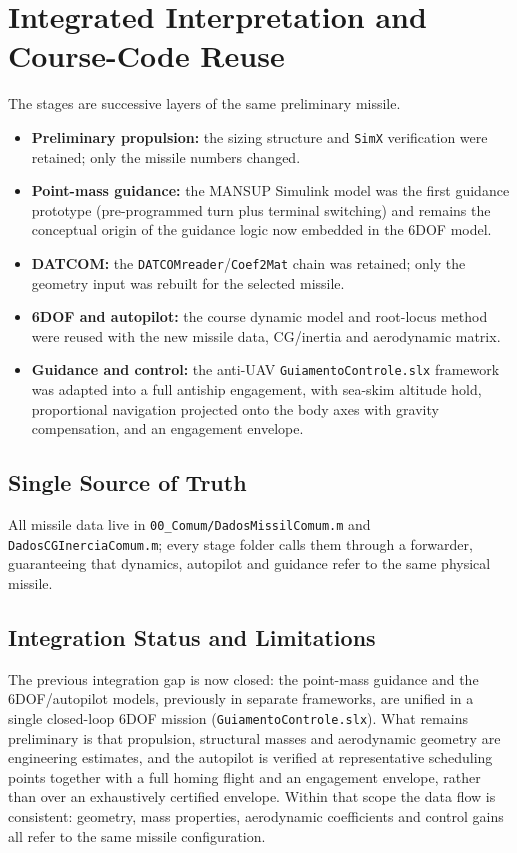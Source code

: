 \section{Integrated Interpretation and Course-Code Reuse}

The stages are successive layers of the same preliminary missile.

\begin{itemize}
    \item \textbf{Preliminary propulsion:} the sizing structure and \texttt{SimX} verification were retained; only the missile numbers changed.
    \item \textbf{Point-mass guidance:} the MANSUP Simulink model was the first guidance prototype (pre-programmed turn plus terminal switching) and remains the conceptual origin of the guidance logic now embedded in the 6DOF model.
    \item \textbf{DATCOM:} the \texttt{DATCOMreader}/\texttt{Coef2Mat} chain was retained; only the geometry input was rebuilt for the selected missile.
    \item \textbf{6DOF and autopilot:} the course dynamic model and root-locus method were reused with the new missile data, CG/inertia and aerodynamic matrix.
    \item \textbf{Guidance and control:} the anti-UAV \texttt{GuiamentoControle.slx} framework was adapted into a full antiship engagement, with sea-skim altitude hold, proportional navigation projected onto the body axes with gravity compensation, and an engagement envelope.
\end{itemize}

\subsection{Single Source of Truth}

All missile data live in \texttt{00\_Comum/DadosMissilComum.m} and \texttt{DadosCGInerciaComum.m}; every stage folder calls them through a forwarder, guaranteeing that dynamics, autopilot and guidance refer to the same physical missile.

\subsection{Integration Status and Limitations}

The previous integration gap is now closed: the point-mass guidance and the 6DOF/autopilot models, previously in separate frameworks, are unified in a single closed-loop 6DOF mission (\texttt{GuiamentoControle.slx}). What remains preliminary is that propulsion, structural masses and aerodynamic geometry are engineering estimates, and the autopilot is verified at representative scheduling points together with a full homing flight and an engagement envelope, rather than over an exhaustively certified envelope. Within that scope the data flow is consistent: geometry, mass properties, aerodynamic coefficients and control gains all refer to the same missile configuration.
